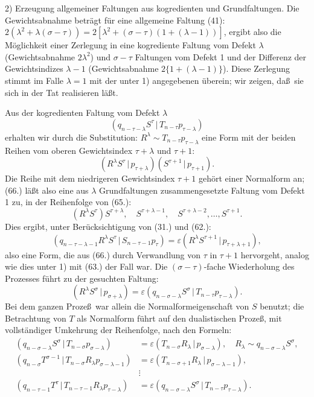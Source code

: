 \documentclass[11pt]{article}
\providecommand{\pair}[2]{(#1\,|\,#2)}
\providecommand{\eps}{\varepsilon}
\begin{document}
2) Erzeugung allgemeiner Faltungen aus kogredienten und Grundfaltungen. Die Gewichtsabnahme betr\"agt f\"ur eine allgemeine Faltung (41): $2(\lambda^2+\lambda(\sigma-\tau))=2[\lambda^2+(\sigma-\tau)(1+(\lambda-1))]$, ergibt also die M\"oglichkeit einer Zerlegung in eine kogrediente Faltung vom Defekt $\lambda$ (Gewichtsabnahme $2\lambda^2$) und $\sigma-\tau$ Faltungen vom Defekt 1 und der Differenz der Gewichtsindizes $\lambda-1$ (Gewichtsabnahme $2\{1+(\lambda-1)\}$). Diese Zerlegung stimmt im Falle $\lambda=1$ mit der unter 1) angegebenen \"uberein; wir zeigen, da\ss\ sie sich in der Tat realisieren l\"a\ss t.

Aus der kogredienten Faltung vom Defekt $\lambda$
\[
 \pair{q_{n-\tau-\lambda}S^\tau}{T_{n-\tau}p_{\tau-\lambda}}
\]
erhalten wir durch die Substitution: $R^\lambda\sim T_{n-\tau}p_{\tau-\lambda}$ eine Form mit der beiden Reihen vom oberen Gewichtsindex $\tau+\lambda$ und $\tau+1$:
\begin{equation}
 \pair{R^\lambda S^\tau}{p_{\tau+\lambda}}\pair{S^{\tau+1}}{p_{\tau+1}}.
\tag{66}
\end{equation}
Die Reihe mit dem niedrigeren Gewichtsindex $\tau+1$ geh\"ort einer Normalform an; (66.) l\"a\ss t also eine aus $\lambda$ Grundfaltungen zusammengesetzte Faltung vom Defekt 1 zu, in der Reihenfolge von (65.):
\[
 (R^\lambda S^\tau)S^{\tau+\lambda},\quad S^{\tau+\lambda-1},\quad S^{\tau+\lambda-2},\ldots,S^{\tau+1}.
\]
Dies ergibt, unter Ber\"ucksichtigung von (31.) und (62.):
\[
 \pair{q_{n-\tau-\lambda-1}R^\lambda S^\tau}{S_{n-\tau-1}p_\tau}=\eps\pair{R^\lambda S^{\tau+1}}{p_{\tau+\lambda+1}},
\]
also eine Form, die aus (66.) durch Verwandlung von $\tau$ in $\tau+1$ hervorgeht, analog wie dies unter 1) mit (63.) der Fall war. Die $(\sigma-\tau)$-fache Wiederholung des Prozesses f\"uhrt zu der gesuchten Faltung:
\[
 \pair{R^\lambda S^\sigma}{p_{\sigma+\lambda}}=\eps\pair{q_{n-\sigma-\lambda}S^\sigma}{T_{n-\tau}p_{\tau-\lambda}}.
\]
Bei dem ganzen Proze\ss\ war allein die Normalformeigenschaft von $S$ benutzt; die Betrachtung von $T$ als Normalform f\"uhrt auf den dualistischen Proze\ss, mit vollst\"andiger Umkehrung der Reihenfolge, nach den Formeln:
\begin{align*}
\pair{q_{n-\sigma-\lambda}S^\sigma}{T_{n-\sigma}p_{\sigma-\lambda}}&=\eps\pair{T_{n-\sigma}R_\lambda}{p_{\sigma-\lambda}},\quad R_\lambda\sim q_{n-\sigma-\lambda}S^\sigma,\\
\pair{q_{n-\sigma}T^{\sigma-1}}{T_{n-\sigma}R_\lambda p_{\sigma-\lambda-1}}&=\eps\pair{T_{n-\sigma+1}R_\lambda}{p_{\sigma-\lambda-1}},\\
&\vdots\\
\pair{q_{n-\tau-1}T^\tau}{T_{n-\tau-1}R_\lambda p_{\tau-\lambda}}&=\eps\pair{q_{n-\sigma-\lambda}S^\sigma}{T_{n-\tau}p_{\tau-\lambda}}.
\end{align*}
\end{document}

